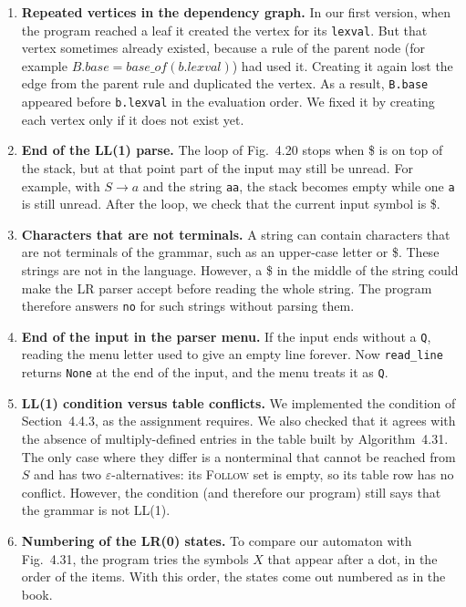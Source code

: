 \documentclass[11pt,a4paper]{article}
\newcommand{\Follow}{\textsc{Follow}}
\newcommand{\code}[1]{\texttt{#1}}
\begin{document}
\begin{enumerate}
  \item \textbf{Repeated vertices in the dependency graph.} In our first version, when the program reached a leaf it created the vertex for its \code{lexval}. But that vertex sometimes already existed, because a rule of the parent node (for example $B.base = base\_of(b.lexval)$) had used it. Creating it again lost the edge from the parent rule and duplicated the vertex. As a result, \code{B.base} appeared before \code{b.lexval} in the evaluation order. We fixed it by creating each vertex only if it does not exist yet.
  \item \textbf{End of the LL(1) parse.} The loop of Fig.~4.20 stops when \$ is on top of the stack, but at that point part of the input may still be unread. For example, with $S \to a$ and the string \code{aa}, the stack becomes empty while one \code{a} is still unread. After the loop, we check that the current input symbol is \$.
  \item \textbf{Characters that are not terminals.} A string can contain characters that are not terminals of the grammar, such as an upper-case letter or \$. These strings are not in the language. However, a \$ in the middle of the string could make the LR parser accept before reading the whole string. The program therefore answers \code{no} for such strings without parsing them.
  \item \textbf{End of the input in the parser menu.} If the input ends without a \code{Q}, reading the menu letter used to give an empty line forever. Now \code{read\_line} returns \code{None} at the end of the input, and the menu treats it as \code{Q}.
  \item \textbf{LL(1) condition versus table conflicts.} We implemented the condition of Section~4.4.3, as the assignment requires. We also checked that it agrees with the absence of multiply-defined entries in the table built by Algorithm~4.31. The only case where they differ is a nonterminal that cannot be reached from $S$ and has two $\varepsilon$-alternatives: its \Follow{} set is empty, so its table row has no conflict. However, the condition (and therefore our program) still says that the grammar is not LL(1).
  \item \textbf{Numbering of the LR(0) states.} To compare our automaton with Fig.~4.31, the program tries the symbols $X$ that appear after a dot, in the order of the items. With this order, the states come out numbered as in the book.
\end{enumerate}
\end{document}
